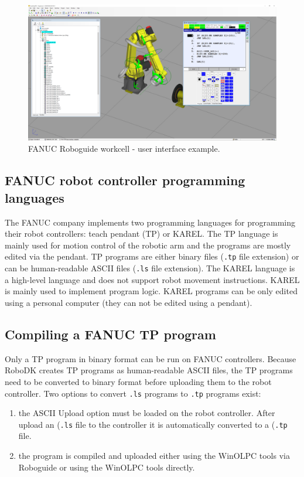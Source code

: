 \begin{figure}[h]
    \centering
    \includegraphics[width=0.9\linewidth]{img/roboguide.PNG}
    \caption{FANUC Roboguide workcell - user interface example.}
    \label{fig:roboguide}
\end{figure}

\subsection{FANUC robot controller programming languages}

The FANUC company implements two programming languages for programming their robot controllers: teach pendant (TP) or KAREL. The TP language is mainly used for motion control of the robotic arm and the programs are mostly edited via the pendant. TP programs are either binary files (\texttt{.tp} file extension) or can be human-readable ASCII files (\texttt{.ls} file extension). The KAREL language is a high-level language and does not support robot movement instructions. KAREL is mainly used to implement program logic. KAREL programs can be only edited using a personal computer (they can not be edited using a pendant).

\subsection{Compiling a FANUC TP program}

Only a TP program in binary format can be run on FANUC controllers. Because RoboDK creates TP programs as human-readable ASCII files, the TP programs need to be converted to binary format before uploading them to the robot controller. Two options to convert \texttt{.ls} programs to \texttt{.tp} programs exist:

\begin{enumerate}
\item the ASCII Upload option must be loaded on the robot controller. After upload an (\texttt{.ls} file to the controller it is automatically converted to a (\texttt{.tp} file.
\item the program is compiled and uploaded either using the WinOLPC  tools via Roboguide or using the WinOLPC tools directly.

\end{enumerate}

